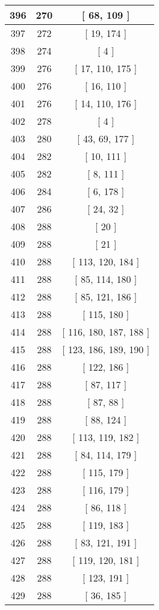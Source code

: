 \begin{center}
\begin{longtable}[H]{|| c c c ||}
\hline
396 & 270 & [ 68, 109 ] \\ 
\hline
397 & 272 & [ 19, 174 ] \\ 
\hline
398 & 274 & [ 4 ] \\ 
\hline
399 & 276 & [ 17, 110, 175 ] \\ 
\hline
400 & 276 & [ 16, 110 ] \\ 
\hline
401 & 276 & [ 14, 110, 176 ] \\ 
\hline
402 & 278 & [ 4 ] \\ 
\hline
403 & 280 & [ 43, 69, 177 ] \\ 
\hline
404 & 282 & [ 10, 111 ] \\ 
\hline
405 & 282 & [ 8, 111 ] \\ 
\hline
406 & 284 & [ 6, 178 ] \\ 
\hline
407 & 286 & [ 24, 32 ] \\ 
\hline
408 & 288 & [ 20 ] \\ 
\hline
409 & 288 & [ 21 ] \\ 
\hline
410 & 288 & [ 113, 120, 184 ] \\ 
\hline
411 & 288 & [ 85, 114, 180 ] \\ 
\hline
412 & 288 & [ 85, 121, 186 ] \\ 
\hline
413 & 288 & [ 115, 180 ] \\ 
\hline
414 & 288 & [ 116, 180, 187, 188 ] \\ 
\hline
415 & 288 & [ 123, 186, 189, 190 ] \\ 
\hline
416 & 288 & [ 122, 186 ] \\ 
\hline
417 & 288 & [ 87, 117 ] \\ 
\hline
418 & 288 & [ 87, 88 ] \\ 
\hline
419 & 288 & [ 88, 124 ] \\ 
\hline
420 & 288 & [ 113, 119, 182 ] \\ 
\hline
421 & 288 & [ 84, 114, 179 ] \\ 
\hline
422 & 288 & [ 115, 179 ] \\ 
\hline
423 & 288 & [ 116, 179 ] \\ 
\hline
424 & 288 & [ 86, 118 ] \\ 
\hline
425 & 288 & [ 119, 183 ] \\ 
\hline
426 & 288 & [ 83, 121, 191 ] \\ 
\hline
427 & 288 & [ 119, 120, 181 ] \\ 
\hline
428 & 288 & [ 123, 191 ] \\ 
\hline
429 & 288 & [ 36, 185 ] \\ 

\end{longtable}
\end{center}
